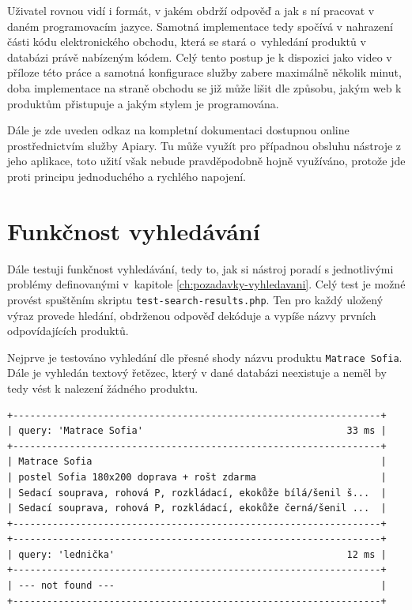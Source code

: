 \documentclass[FM,DP]{tulthesis}
\newenvironment{code}
    {\filbreak\captionsetup{type=listing}}{\filbreak}
\begin{document}
Uživatel rovnou vidí i formát, v jakém obdrží odpověď a jak s ní pracovat v daném programovacím jazyce.
Samotná implementace tedy spočívá v nahrazení části kódu elektronického obchodu, která se stará o~vyhledání 
produktů v databázi právě nabízeným kódem. Celý tento postup je k dispozici jako video v příloze této práce
a samotná konfigurace služby zabere maximálně několik minut, doba implementace na straně obchodu se již může
lišit dle způsobu, jakým web k produktům přistupuje a jakým stylem je programována.

Dále je zde uveden odkaz na kompletní dokumentaci dostupnou online prostřednictvím služby Apiary.
Tu může využít pro případnou obsluhu nástroje z jeho aplikace, toto užití však nebude pravděpodobně
hojně využíváno, protože jde proti principu jednoduchého a rychlého napojení.

\section{Funkčnost vyhledávání}

Dále testuji funkčnost vyhledávání, tedy to, jak si nástroj poradí s jednotlivými problémy 
definovanými v~kapitole \ref{ch:pozadavky-vyhledavani}. Celý test je možné provést spuštěním
skriptu \verb|test-search-results.php|. Ten pro každý uložený výraz provede hledání, 
obdrženou odpověď dekóduje a vypíše názvy prvních odpovídajících produktů.

Nejprve je testováno vyhledání dle přesné shody názvu produktu \verb|Matrace Sofia|. Dále
je vyhledán textový řetězec, který v dané databázi neexistuje a neměl by tedy vést k nalezení
žádného produktu.

\begin{code}
\captionsetup{singlelinecheck=false,justification=raggedright}
\label{code:search-exact}
\begin{verbatim}
+-----------------------------------------------------------------+
| query: 'Matrace Sofia'                                    33 ms |
+-----------------------------------------------------------------+
| Matrace Sofia                                                   |
| postel Sofia 180x200 doprava + rošt zdarma                      |
| Sedací souprava, rohová P, rozkládací, ekokůže bílá/šenil š...  |
| Sedací souprava, rohová P, rozkládací, ekokůže černá/šenil ...  |
+-----------------------------------------------------------------+
+-----------------------------------------------------------------+
| query: 'lednička'                                         12 ms |
+-----------------------------------------------------------------+
| --- not found ---                                               |
+-----------------------------------------------------------------+
\end{verbatim}
\end{code}
\end{document}

